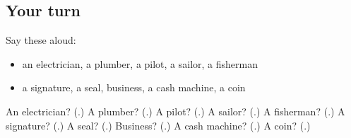 \subsection*{Your turn}
Say these aloud:

\begin{itemize}
\raggedright
  \item an electrician, a plumber, a pilot, a sailor, a fisherman
  \item a signature, a seal, business, a cash machine, a coin
\end{itemize}

\begin{tcolorbox}[breakable,colback=teal!4,colframe=teal!35!black,title={Before you move on}]
An electrician? (\textbf{}.) A plumber? (\textbf{}.) A pilot? (\textbf{}.) A sailor? (\textbf{}.) A fisherman? (\textbf{}.) A signature? (\textbf{}.) A seal? (\textbf{}.) Business? (\textbf{}.) A cash machine? (\textbf{}.) A coin? (\textbf{}.)
\end{tcolorbox}
